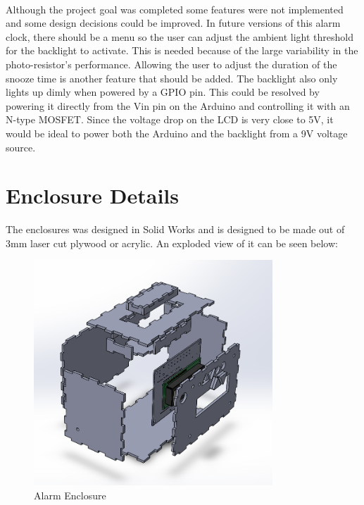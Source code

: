 \documentclass{article}
\begin{document}
\paragraph{}
Although the project goal was completed some features were not implemented and some design decisions could be improved. In future versions of this alarm clock, there should be a menu so the user can adjust the ambient light threshold for the backlight to activate. This is needed because of the large variability in the photo-resistor's performance. Allowing the user to adjust the duration of the snooze time is another feature that should be added. The backlight also only lights up dimly when powered by a GPIO pin. This could be resolved by powering it directly from the Vin pin on the Arduino and controlling it with an N-type MOSFET. Since the voltage drop on the LCD is very close to 5V, it would be ideal to power both the Arduino and the backlight from a 9V voltage source.


\newpage
{}



\appendix
\newpage
\section{Enclosure Details} %
The enclosures was designed in Solid Works and is designed to be made out of 3mm laser cut plywood or acrylic. An exploded view of it can be seen below:

\begin{figure}[h]
    \centering
    \includegraphics[width=0.8\textwidth]{AlarmExploded.png}
    \caption{Alarm Enclosure}
    \label{fig:exp}
\end{figure}
\end{document}
